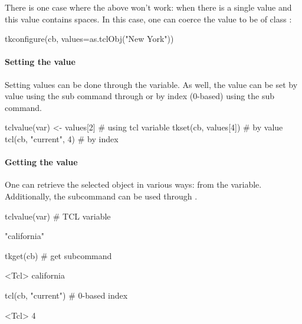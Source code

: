 There is one case where the above won't work: when there is a single
value and this value contains spaces. In this case, one can coerce the
value to be of class :
\begin{Schunk}
\begin{Sinput}
 tkconfigure(cb, values=as.tclObj("New York"))
\end{Sinput}
\end{Schunk}

\paragraph{Setting the value}
Setting values can be done through the \TCL\/ variable. As well, the
value can be set by value using the  sub
command through  or by index (0-based) using the
 sub command.

\begin{Schunk}
\begin{Sinput}
 tclvalue(var) <- values[2]            # using tcl variable
 tkset(cb, values[4])                  # by value
 tcl(cb, "current", 4)                 # by index
\end{Sinput}
\end{Schunk}


\paragraph{Getting the value}
One can retrieve the selected object in various ways: from the \TCL\/
variable. Additionally, the  subcommand
can be used through .

\begin{Schunk}
\begin{Sinput}
 tclvalue(var)                           # TCL variable
\end{Sinput}
\begin{Soutput}
[1] "california"
\end{Soutput}
\begin{Sinput}
 tkget(cb)                               # get subcommand
\end{Sinput}
\begin{Soutput}
<Tcl> california 
\end{Soutput}
\begin{Sinput}
 tcl(cb, "current")                      # 0-based index
\end{Sinput}
\begin{Soutput}
<Tcl> 4 
\end{Soutput}
\end{Schunk}


